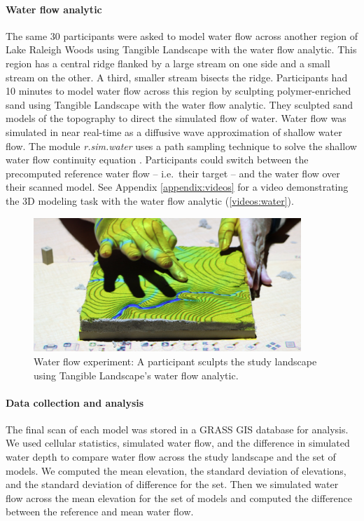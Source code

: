 \documentclass[prodmode,acmtochi]{acmsmall} %
\begin{document}
\paragraph{Water flow analytic}
The same 30 participants were asked to model water flow 
across another region of Lake Raleigh Woods
using Tangible Landscape with the water flow analytic.
This region has a central ridge 
flanked by a large stream on one side 
and a small stream on the other.  
A third, smaller stream bisects the ridge.
Participants had 10 minutes to model water flow across this region
by sculpting polymer-enriched sand using Tangible Landscape 
with the water flow analytic. 
They sculpted sand models of the topography
to direct the simulated flow of water.  
Water flow was simulated in near real-time 
as a diffusive wave approximation of shallow water flow.
The module \textit{r.sim.water} \cite{r.sim.water}
uses a path sampling technique to solve the shallow water flow continuity equation \cite{Mitasova2004}.
Participants could switch between the precomputed reference water flow 
-- i.e.~their target -- 
and the water flow over their scanned model.
%
See Appendix \ref{appendix:videos}
for a video demonstrating the 3D modeling task with the water flow analytic (\ref{videos:water}).

\begin{figure}
\begin{center}
	\includegraphics[width=0.9\textwidth]{images/experiments/tl_water.jpg}
	\caption{Water flow experiment: 
	A participant sculpts the study landscape using Tangible Landscape's water flow
	analytic.}
	\label{fig:flow_sequence}
\end{center}
\end{figure}

\paragraph{Data collection and analysis}
The final scan of each model was stored in a GRASS GIS database for analysis. 
We used cellular statistics, simulated water flow, and the difference in simulated water depth 
to compare water flow across the study landscape and the set of models.
We computed the mean elevation,
the standard deviation of elevations, 
and the standard deviation of difference for the set.
Then we simulated water flow across the mean elevation for the set of models
and computed the difference between the reference and mean water flow. 
\end{document}
